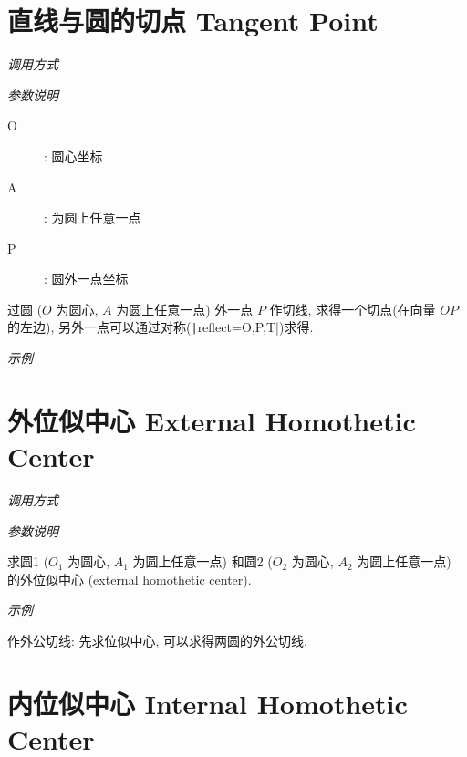 
\section{直线与圆的切点 Tangent Point}

\emph{调用方式}

\begin{tcolorbox}{}
\end{tcolorbox}

\emph{参数说明}

\begin{description}
  \item[O]: 圆心坐标
  \item[A]: 为圆上任意一点
  \item[P]: 圆外一点坐标
\end{description}

过圆 ($O$ 为圆心, $A$ 为圆上任意一点) 外一点 $P$ 作切线, 求得一个切点(在向量 $OP$ 的左边),
另外一点可以通过对称(\texttt|reflect={O,P,T}|)求得.

\emph{示例}


\section{外位似中心 External Homothetic Center}

\emph{调用方式}

\begin{tcolorbox}{}
\end{tcolorbox}

\emph{参数说明}

求圆1 ($O_1$ 为圆心, $A_1$ 为圆上任意一点)
和圆2 ($O_2$ 为圆心, $A_2$ 为圆上任意一点) 
的外位似中心 (external homothetic center)\cite{HOMO}.

\emph{示例}

作外公切线: 先求位似中心, 可以求得两圆的外公切线.


\section{内位似中心 Internal Homothetic Center}

